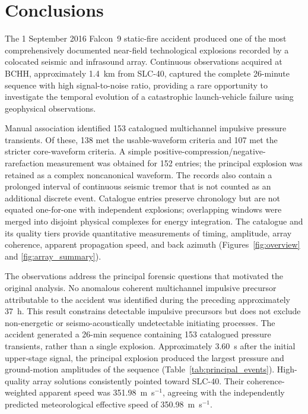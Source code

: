 \documentclass[]{seismica}
\begin{document}
\section{Conclusions}
\label{sec:conclusions}

The 1 September 2016 Falcon~9 static-fire accident produced one of the most comprehensively documented near-field technological explosions recorded by a colocated seismic and infrasound array. Continuous observations acquired at BCHH, approximately 1.4~km from SLC-40, captured the complete 26-minute sequence with high signal-to-noise ratio, providing a rare opportunity to investigate the temporal evolution of a catastrophic launch-vehicle failure using geophysical observations.

Manual association identified 153 catalogued multichannel impulsive pressure
transients. Of these, 138 met the usable-waveform criteria and 107 met the
stricter core-waveform criteria. A simple
positive-compression/negative-rarefaction measurement was obtained for 152
entries; the principal explosion was retained as a complex noncanonical
waveform. The records also contain a prolonged interval of continuous seismic
tremor that is not counted as an additional discrete event. Catalogue entries
preserve chronology but are not equated one-for-one with independent
explosions; overlapping windows were merged into disjoint physical complexes
for energy integration. The catalogue and its quality tiers provide
quantitative measurements of timing, amplitude, array coherence, apparent
propagation speed, and back azimuth (Figures~\ref{fig:overview} and
\ref{fig:array_summary}).

The observations address the principal forensic questions that motivated the
original analysis. No anomalous coherent multichannel impulsive precursor
attributable to the accident was identified during the preceding approximately
37~h. This result constrains detectable impulsive precursors but does not
exclude non-energetic or seismo-acoustically undetectable initiating processes.
The accident generated a 26-min sequence containing 153 catalogued pressure
transients, rather than a single explosion. Approximately 3.60~s after the initial
upper-stage signal, the principal explosion produced the largest pressure and
ground-motion amplitudes of the sequence (Table~\ref{tab:principal_events}).
High-quality array solutions consistently pointed toward SLC-40. Their
coherence-weighted apparent speed was 351.98~m~s$^{-1}$, agreeing with the
independently predicted meteorological effective speed of
350.98~m~s$^{-1}$.
\end{document}
